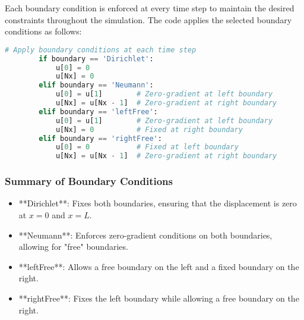\documentclass{article}
\begin{document}
		Each boundary condition is enforced at every time step to maintain the desired constraints throughout the simulation. The code applies the selected boundary conditions as follows:
		
		\begin{lstlisting}[language=Python, caption=Applying Boundary Conditions at Each Time Step]
		# Apply boundary conditions at each time step
		if boundary == 'Dirichlet':
			u[0] = 0
			u[Nx] = 0
		elif boundary == 'Neumann':
			u[0] = u[1]        # Zero-gradient at left boundary
			u[Nx] = u[Nx - 1]  # Zero-gradient at right boundary
		elif boundary == 'leftFree':
			u[0] = u[1]        # Zero-gradient at left boundary
			u[Nx] = 0          # Fixed at right boundary
		elif boundary == 'rightFree':
			u[0] = 0           # Fixed at left boundary
			u[Nx] = u[Nx - 1]  # Zero-gradient at right boundary
		\end{lstlisting}
		
		\subsubsection{Summary of Boundary Conditions} 
		
		\begin{itemize}
		\item **Dirichlet**: Fixes both boundaries, ensuring that the displacement is zero at \( x = 0 \) and \( x = L \).
		\item **Neumann**: Enforces zero-gradient conditions on both boundaries, allowing for "free" boundaries.
		\item **leftFree**: Allows a free boundary on the left and a fixed boundary on the right.
		\item **rightFree**: Fixes the left boundary while allowing a free boundary on the right.
		\end{itemize}
		
		\begin{comment}
		\subsubsection{Importance of Boundary Conditions in Wave Propagation} 
		
		The choice of boundary condition influences how waves interact with the boundaries of the domain:
		\begin{itemize}
		\item **Fixed (Dirichlet) boundaries** reflect waves with inversion, resulting in interference patterns within the domain.
		\item **Free (Neumann) boundaries** reflect waves without inversion, creating a different interference pattern.
		\item **Mixed boundaries** allow for a combination of behaviors, useful in modeling scenarios where one side is free (e.g., an open end) and the other is fixed.
		\end{itemize}
		
		The flexibility to choose boundary conditions in the \texttt{solve\_wave\_equation} function enables users to simulate various physical setups and study the impact of boundary behaviors on wave propagation.
		\end{comment}
				
\end{document}
